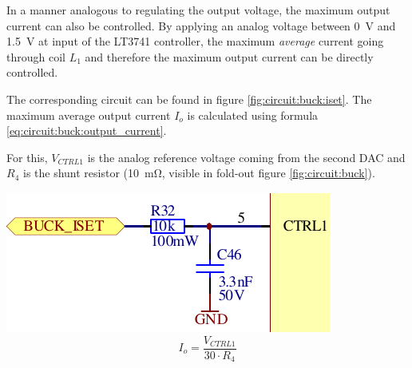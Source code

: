 \begin{minipage}{.50\textwidth}
    In a manner analogous to regulating the output voltage, the maximum output
    current can  also be  controlled.  By applying  an analog  voltage between
    \SI{0}{\volt}  and \SI{1.5}{\volt}  at  input   of the  LT3741
    controller, the  maximum \emph{average}  current going through  coil $L_1$
    and therefore the maximum output current can be directly controlled.

    The     corresponding    circuit     can     be     found    in     figure
    \ref{fig:circuit:buck:iset}.  The maximum average  output current $I_o$ is
    calculated using formula \ref{eq:circuit:buck:output_current}.

    For  this, $V_{CTRL1}$  is the  analog reference  voltage coming  from the
    second DAC and  $R_4$ is the shunt  resistor (\SI{10}{\milli\ohm}, visible
    in fold-out figure \ref{fig:circuit:buck}).

\end{minipage}
\begin{minipage}{.50\textwidth}
    \center
    \includegraphics[width=.9\textwidth]{images/circuit/buck-iset.pdf}
    \label{fig:circuit:buck:iset}
    \begin{equation}
        I_o = \frac{V_{CTRL1}}{30 \cdot R_4}
        \label{eq:circuit:buck:output_current}
    \end{equation}
\end{minipage}


